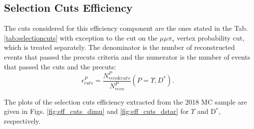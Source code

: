 \subsection{Selection Cuts Efficiency}

The cuts considered for this efficiency component are the ones stated in the Tab. \ref{tab:selectioncuts} with exception to the cut on the $\mu\mu\pi_s$ vertex probability cut, which is treated separately. The denominator is the number of reconstructed events that passed the precuts criteria and the numerator is the number of events that passed the cuts and the precuts:
\begin{equation}
  \epsilon_{cuts}^P = \frac{N_{reco\&cuts}^P}{N_{reco}^P} (P = \Upsilon, D^*).
\end{equation}

The plots of the selection cuts efficiency extracted from the 2018 MC sample are given in Figs. \ref{fig:eff_cuts_dimu} and \ref{fig:eff_cuts_dstar} for $\Upsilon$ and D$^*$, respectively.

